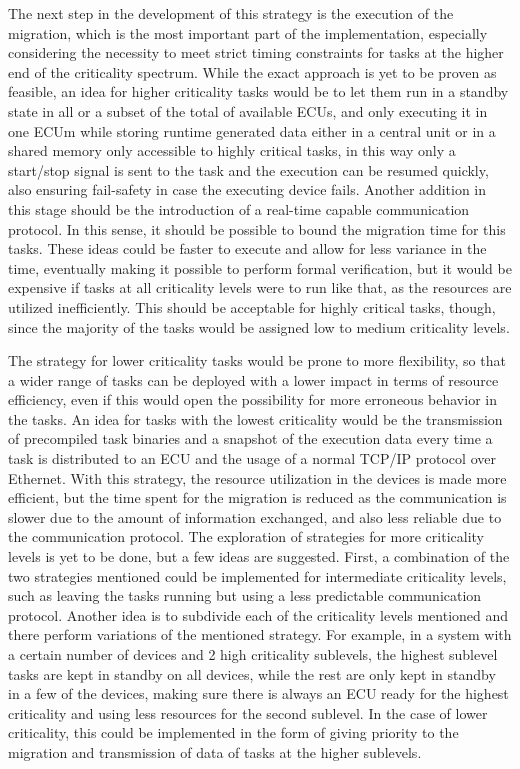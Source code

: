 The next step in the development of this strategy is the execution of the migration, which is the most important part of the implementation, especially considering the necessity to meet strict timing constraints for tasks at the higher end of the criticality spectrum. While the exact approach is yet to be proven as feasible, an idea for higher criticality tasks would be to let them run in a standby state in all or a subset of the total of available ECUs, and only executing it in one ECUm while storing runtime generated data either in a central unit or in a shared memory only accessible to highly critical tasks, in this way only a start/stop signal is sent to the task and the execution can be resumed quickly, also ensuring fail-safety in case the executing device fails. Another addition in this stage should be the introduction of a real-time capable communication protocol. In this sense, it should be possible to bound the migration time for this tasks. These ideas could be faster to execute and allow for less variance in the time, eventually making it possible to perform formal verification, but it would be expensive if tasks at all criticality levels were to run like that, as the resources are utilized inefficiently. This should be acceptable for highly critical tasks, though, since the majority of the tasks would be assigned low to medium criticality levels.

The strategy for lower criticality tasks would be prone to more flexibility, so that a wider range of tasks can be deployed with a lower impact in terms of resource efficiency, even if this would open the possibility for more erroneous behavior in the tasks. An idea for tasks with the lowest criticality would be the transmission of precompiled task binaries and a snapshot of the execution data every time a task is distributed to an ECU and the usage of a normal TCP/IP protocol over Ethernet. With this strategy, the resource utilization in the devices is made more efficient, but the time spent for the migration is reduced as the communication is slower due to the amount of information exchanged, and also less reliable due to the communication protocol. The exploration of strategies for more criticality levels is yet to be done, but a few ideas are suggested. First, a combination of the two strategies mentioned could be implemented for intermediate criticality levels, such as leaving the tasks running but using a less predictable communication protocol. Another idea is to subdivide each of the criticality levels mentioned and there perform variations of the mentioned strategy. For example, in a system with a certain number of devices and 2 high criticality sublevels, the highest sublevel tasks are kept in standby on all devices, while the rest are only kept in standby in a few of the devices, making sure there is always an ECU ready for the highest criticality and using less resources for the second sublevel. In the case of lower criticality, this could be implemented in the form of giving priority to the migration and transmission of data of tasks at the higher sublevels.

